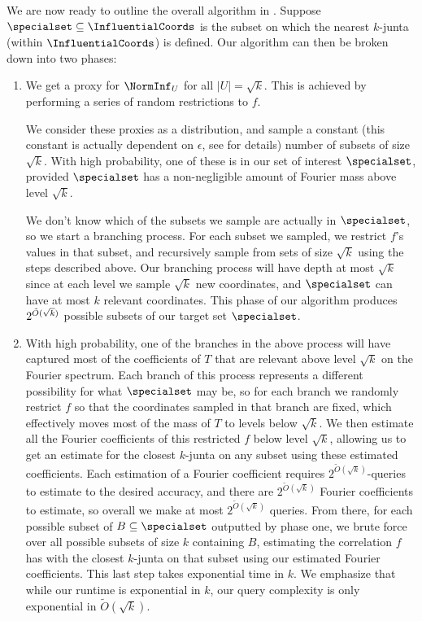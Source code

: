 We are now ready to outline the overall algorithm in . Suppose $\specialset\subseteq \InfluentialCoords$ is the subset on which the nearest $k$-junta (within $\InfluentialCoords$) is defined. Our algorithm can then be broken down into two phases:
\begin{enumerate}
    \item[Phase 1.] We get a proxy for $\NormInf_U$ for all $|U| = \sqrt{k}$. This is achieved by performing a series of random restrictions to $f$.
    
    We consider these proxies as a distribution, and sample a constant (this constant is actually dependent on $\epsilon$, see  for details) number of subsets of size $\sqrt{k}$. With high probability, one of these is in our set of interest $\specialset$, provided $\specialset$ has a non-negligible amount of Fourier mass above level $\sqrt{k}$. 
    
     We don't know which of the subsets we sample are actually in $\specialset$, so we start a branching process. For each subset we sampled, we restrict $f$'s values in that subset, and recursively sample from sets of size $\sqrt{k}$ using the steps described above. Our branching process will have depth at most $\sqrt{k}$ since at each level we sample $\sqrt{k}$ new coordinates, and $\specialset$ can have at most $k$ relevant coordinates. This phase  of our algorithm produces $2^{\Tilde{O}(\sqrt{k})}$ possible subsets of our target set $\specialset$.
    \item[Phase 2.] With high probability, one of the branches in the above process will have captured most of the coefficients of $T$ that are relevant above level $\sqrt{k}$ on the Fourier spectrum. Each branch of this process represents a different possibility for what $\specialset$ may be, so for each branch we randomly restrict $f$ so that the coordinates sampled in that branch are fixed, which effectively moves most of the mass of $T$ to levels below $\sqrt{k}$. 
    We then estimate all the Fourier coefficients of this restricted $f$ below level $\sqrt{k}$, allowing us to get an estimate for the closest $k$-junta on any subset using these estimated coefficients. 
    Each estimation of a Fourier coefficient requires $2^{\tilde{O}(\sqrt{k})}$-queries to estimate to the desired accuracy, and there are $2^{\tilde{O}(\sqrt{k})}$ Fourier coefficients to estimate, so overall we make at most $2^{\tilde{O}(\sqrt{k})}$ queries. From there, for each possible subset of $B \subseteq \specialset$ outputted by phase one, we brute force over all possible subsets of size $k$ containing $B$, estimating the correlation $f$ has with the closest $k$-junta on that subset using our estimated Fourier coefficients. This last step takes exponential time in $k$. We emphasize that while our runtime is exponential in $k$, our query complexity is only exponential in $\tilde{O}(\sqrt{k})$.
%
\end{enumerate} 
